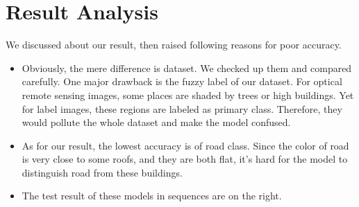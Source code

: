 \documentclass[]{IEEEtran}
\begin{document}
\section{Result Analysis}
	We discussed about our result, then raised following reasons for poor accuracy.
	\begin{itemize}
		\item Obviously, the mere difference is dataset. We checked up them and compared carefully. One major drawback is the fuzzy label of our dataset. For optical remote sensing images, some places are shaded by trees or high buildings. Yet for label images, these regions are labeled as primary class. Therefore, they would pollute the whole dataset and make the model confused.   
		\item As for our result, the lowest accuracy is of road class. Since the color of road is very close to some roofs, and they are both flat, it's hard for the model to distinguish road from these buildings.  
		\item The test result of these models in sequences are on the right.
	\end{itemize}
\newpage
\end{document}
